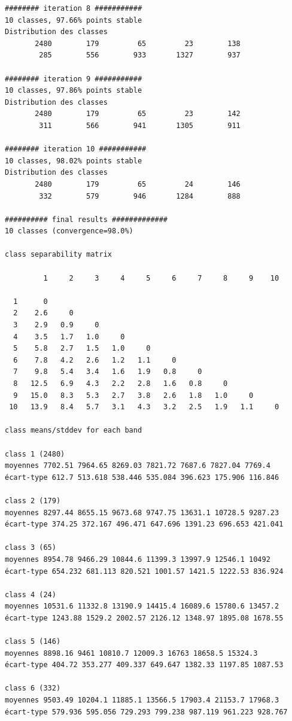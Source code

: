 \documentclass[earth,article,accept,pdftex,moreauthors]{Definitions/mdpi}
\begin{document}
{\begin{scriptsize}
\begin{verbatim}
######## iteration 8 ###########
10 classes, 97.66% points stable
Distribution des classes
       2480        179         65         23        138
        285        556        933       1327        937

######## iteration 9 ###########
10 classes, 97.86% points stable
Distribution des classes
       2480        179         65         23        142
        311        566        941       1305        911

######## iteration 10 ###########
10 classes, 98.02% points stable
Distribution des classes
       2480        179         65         24        146
        332        579        946       1284        888

########## final results #############
10 classes (convergence=98.0%)

class separability matrix

         1     2     3     4     5     6     7     8     9    10

  1      0
  2    2.6     0
  3    2.9   0.9     0
  4    3.5   1.7   1.0     0
  5    5.8   2.7   1.5   1.0     0
  6    7.8   4.2   2.6   1.2   1.1     0
  7    9.8   5.4   3.4   1.6   1.9   0.8     0
  8   12.5   6.9   4.3   2.2   2.8   1.6   0.8     0
  9   15.0   8.3   5.3   2.7   3.8   2.6   1.8   1.0     0
 10   13.9   8.4   5.7   3.1   4.3   3.2   2.5   1.9   1.1     0

class means/stddev for each band

class 1 (2480)
moyennes 7702.51 7964.65 8269.03 7821.72 7687.6 7827.04 7769.4
écart-type 612.7 513.618 538.446 535.084 396.623 175.906 116.846

class 2 (179)
moyennes 8297.44 8655.15 9673.68 9747.75 13631.1 10728.5 9287.23
écart-type 374.25 372.167 496.471 647.696 1391.23 696.653 421.041

class 3 (65)
moyennes 8954.78 9466.29 10844.6 11399.3 13997.9 12546.1 10492
écart-type 654.232 681.113 820.521 1001.57 1421.5 1222.53 836.924

class 4 (24)
moyennes 10531.6 11332.8 13190.9 14415.4 16089.6 15780.6 13457.2
écart-type 1243.88 1529.2 2002.57 2126.12 1348.97 1895.08 1678.55

class 5 (146)
moyennes 8898.16 9461 10810.7 12009.3 16763 18658.5 15324.3
écart-type 404.72 353.277 409.337 649.647 1382.33 1197.85 1087.53

class 6 (332)
moyennes 9503.49 10204.1 11885.1 13566.5 17903.4 21153.7 17968.3
écart-type 579.936 595.056 729.293 799.238 987.119 961.223 928.767


\end{verbatim}
\end{scriptsize}}
\end{document}
